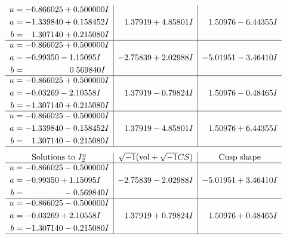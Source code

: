 \documentclass[1p]{elsarticle_modified}
\theoremstyle{definition}
\newcommand{\I}{\sqrt{-1}}
\begin{document}
$$\begin{array}{c|c|c}
\begin{aligned}
u &= -0.866025 + 0.500000 I \\
a &= -1.339840 + 0.158452 I \\
b &= \phantom{-}1.307140 + 0.215080 I\end{aligned}
 & \phantom{-}1.37919 + 4.85801 I & \phantom{-}1.50976 - 6.44355 I \\ \hline\begin{aligned}
u &= -0.866025 + 0.500000 I \\
a &= -0.99350 - 1.15095 I \\
b &= \phantom{-0.000000 -}0.569840 I\end{aligned}
 & -2.75839 + 2.02988 I & -5.01951 - 3.46410 I \\ \hline\begin{aligned}
u &= -0.866025 + 0.500000 I \\
a &= -0.03269 - 2.10558 I \\
b &= -1.307140 + 0.215080 I\end{aligned}
 & \phantom{-}1.37919 - 0.79824 I & \phantom{-}1.50976 - 0.48465 I \\ \hline\begin{aligned}
u &= -0.866025 - 0.500000 I \\
a &= -1.339840 - 0.158452 I \\
b &= \phantom{-}1.307140 - 0.215080 I\end{aligned}
 & \phantom{-}1.37919 - 4.85801 I & \phantom{-}1.50976 + 6.44355 I\\
 \hline 
 \end{array}$$\newpage$$\begin{array}{c|c|c}  
\text{Solutions to }I^u_{2}& \I (\text{vol} + \sqrt{-1}CS) & \text{Cusp shape}\\
 \hline 
\begin{aligned}
u &= -0.866025 - 0.500000 I \\
a &= -0.99350 + 1.15095 I \\
b &= \phantom{-0.000000 } -0.569840 I\end{aligned}
 & -2.75839 - 2.02988 I & -5.01951 + 3.46410 I \\ \hline\begin{aligned}
u &= -0.866025 - 0.500000 I \\
a &= -0.03269 + 2.10558 I \\
b &= -1.307140 - 0.215080 I\end{aligned}
 & \phantom{-}1.37919 + 0.79824 I & \phantom{-}1.50976 + 0.48465 I\\
 \hline 
 \end{array}$$\newpage
\end{document}
